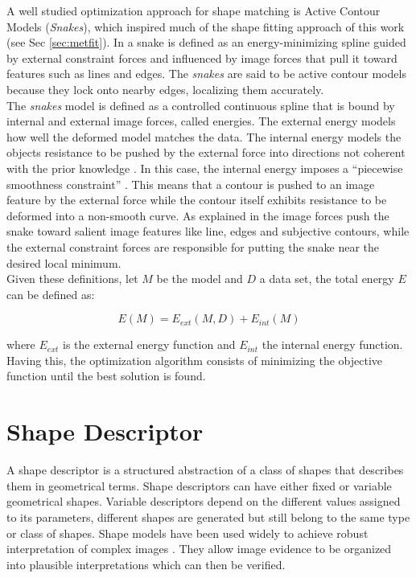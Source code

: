 A well studied optimization approach for shape matching is
Active Contour Models (\emph{Snakes}),  which inspired much 
of the shape fitting approach of this work 
(see Sec \ref{sec:metfit}). In \cite{snakes} a snake is defined 
as an energy-minimizing spline guided by external constraint
forces and influenced by image forces that pull it toward 
features such as lines and edges. The \emph{snakes} are said to
be active contour models because they lock onto nearby edges,
localizing them accurately.\\
The \emph{snakes} model is defined as a controlled continuous spline that is bound
by internal and external image forces, called energies. The external energy models how well
the deformed model matches the data. The internal energy models
the objects resistance to be pushed by the external force into directions not coherent
with the prior knowledge \cite{deformable}. In this case, the internal energy  imposes 
a ``piecewise smoothness constraint'' \cite{snakes}. This means that a contour is
pushed to an image feature by the external force while the contour itself exhibits resistance
to be deformed into a non-smooth curve. As explained in \cite{deformable} the image forces push the snake toward
salient image features like line, edges and subjective contours, while the external constraint forces
are responsible for putting the snake near the desired local minimum.\\

Given these definitions, let $M$ be the model and $D$ a data set, 
the total energy $E$ can be defined as:

$$E(M) = E_{ext}(M,D) + E_{int}(M)$$

where $E_{ext}$ is the external energy function and $E_{int}$ the 
internal energy function. 
Having this, the optimization algorithm consists of minimizing the objective
function until the best solution is found.


\section{Shape Descriptor}
\label{sec:shapedesc}

A shape descriptor is a structured abstraction of a class
of shapes that describes them in geometrical terms.
Shape descriptors can have either fixed or variable
geometrical shapes. Variable descriptors depend on the different values assigned to its
parameters, different shapes are generated but still belong to the same type or class of shapes.
Shape models have been used widely to achieve robust interpretation of complex
images \cite{wormparam}. They allow image evidence to be organized into plausible interpretations
which can then be verified.\\

